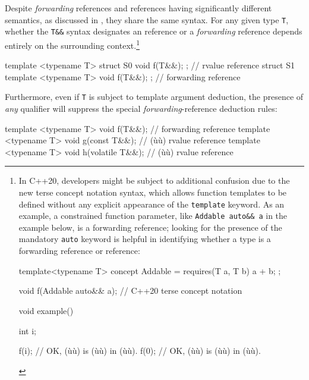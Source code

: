 Despite \emph{forwarding} references and  
references having significantly different semantics, as discussed in , 
they share the same syntax. For any given type \lstinline!T!,
whether the \lstinline!T&&! syntax designates an  
reference or a \emph{forwarding} reference depends entirely on the
surrounding context.{\cprotect\footnote{In C++20, developers might be
subject to additional confusion due to the new terse concept notation
syntax, which allows function templates to be defined without any
explicit appearance of the \lstinline!template! keyword. As an example, a
constrained function parameter, like
\lstinline!Addable!~\lstinline!auto&&!~\lstinline!a! in the example below, is a forwarding
reference; looking for the presence of the mandatory \lstinline!auto!
keyword is helpful in identifying whether a type is a forwarding
reference or  reference:

\begin{emcppslisting}[emcppsstandards=c++20,style=footcode]
template<typename T>
concept Addable = requires(T a, T b) { a + b; };

void f(Addable auto&& a);  // C++20 terse concept notation

void example()
{
    int i;

    f(i);  // OK, (ù{}ù) is (ù{}ù) in (ù{}ù).
    f(0);  // OK, (ù{}ù) is (ù{}ù) in (ù{}ù).
}
\end{emcppslisting}
      }}

\begin{emcppslisting}
template <typename T> struct S0 { void f(T&&); };  // rvalue reference
struct S1 { template <typename T> void f(T&&); };  // forwarding reference
\end{emcppslisting}

\noindent Furthermore, even if \lstinline!T! is subject to template argument
deduction, the presence of \emph{any} qualifier will suppress the
special \emph{forwarding}-reference deduction rules:

\begin{emcppslisting}
template <typename T> void f(T&&);           // forwarding reference
template <typename T> void g(const T&&);     // (ù{}ù) rvalue reference
template <typename T> void h(volatile T&&);  // (ù{}ù) rvalue reference
\end{emcppslisting}

